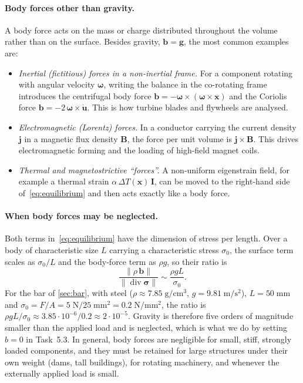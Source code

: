 \documentclass[11pt,a4paper]{article}
\numberwithin{equation}{section}
\theoremstyle{remark}
\newcommand{\dv}{\operatorname{div}}
\newcommand{\bu}{\bm{u}}
\newcommand{\bx}{\bm{x}}
\newcommand{\bb}{\bm{b}}
\newcommand{\bsig}{\bm{\sigma}}
\begin{document}
\paragraph{Body forces other than gravity.}
A body force acts on the mass or charge distributed throughout the volume rather than on
the surface. Besides gravity, $\bb = \bm{g}$, the most common examples are:
\begin{itemize}\setlength{\itemsep}{1pt}
  \item \emph{Inertial (fictitious) forces in a non-inertial frame.} For a component
    rotating with angular velocity $\bm{\omega}$, writing the balance in the co-rotating
    frame introduces the centrifugal body force $\bb = -\bm{\omega}\times(\bm{\omega}\times\bx)$
    and the Coriolis force $\bb = -2\,\bm{\omega}\times\dot{\bu}$. This is how turbine
    blades and flywheels are analysed.
  \item \emph{Electromagnetic (Lorentz) forces.} In a conductor carrying the current
    density $\bm{j}$ in a magnetic flux density $\bm{B}$, the force per unit volume is
    $\bm{j}\times\bm{B}$. This drives electromagnetic forming and the loading of
    high-field magnet coils.
  \item \emph{Thermal and magnetostrictive ``forces''.} A non-uniform eigenstrain field,
    for example a thermal strain $\alpha\,\Delta T(\bx)\,\bm{I}$, can be moved to the
    right-hand side of~\eqref{eq:equilibrium} and then acts exactly like a body force.
\end{itemize}

\paragraph{When body forces may be neglected.}
Both terms in~\eqref{eq:equilibrium} have the dimension of stress per length. Over a
body of characteristic size $L$ carrying a characteristic stress $\sigma_0$, the surface
term scales as $\sigma_0/L$ and the body-force term as $\rho g$, so their ratio is
\begin{equation}\label{eq:ratio}
  \frac{\|\rho\,\bb\|}{\|\dv\bsig\|} \sim \frac{\rho g L}{\sigma_0}.
\end{equation}
For the bar of \cref{sec:bar}, with steel ($\rho \approx 7.85\;\mathrm{g/cm^3}$, $g = 9.81\;\mathrm{m/s^2}$), $L = 50\;\mathrm{mm}$ and
$\sigma_0 = F/A = 5\;\mathrm{N}/25\;\mathrm{mm^2} = 0.2\;\mathrm{N/mm^2}$, the ratio is
$\rho g L/\sigma_0 \approx 3.85\cdot10^{-6}/0.2 \approx 2\cdot10^{-5}$. Gravity is
therefore five orders of magnitude smaller than the applied load and is neglected, which
is what we do by setting $b = 0$ in Task~5.3. In general, body forces are negligible for
small, stiff, strongly loaded components, and they must be retained for large structures
under their own weight (dams, tall buildings), for rotating machinery, and whenever the
externally applied load is small.
\end{document}
